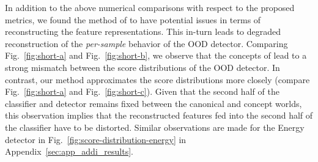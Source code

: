 In addition to the above numerical comparisons with respect to the proposed metrics, we found the method of \citet{yeh2020completeness} to have potential issues in terms of reconstructing the feature representations. This in-turn leads to degraded reconstruction of the \textit{per-sample} behavior of the OOD detector.
Comparing Fig.~\ref{fig:short-a} and Fig.~\ref{fig:short-b}, we observe that the concepts of \citet{yeh2020completeness} lead to a strong mismatch between the score distributions of the OOD detector. In contrast, our method approximates the score distributions more closely (compare Fig.~\ref{fig:short-a} and Fig.~\ref{fig:short-c}).
Given that the second half of the classifier and detector remains fixed between the canonical and concept worlds, this observation implies that the reconstructed features fed into the second half of the classifier have to be distorted. Similar observations are made for the Energy detector in Fig.~\ref{fig:score-distribution-energy} in Appendix~\ref{sec:app_addi_results}.
